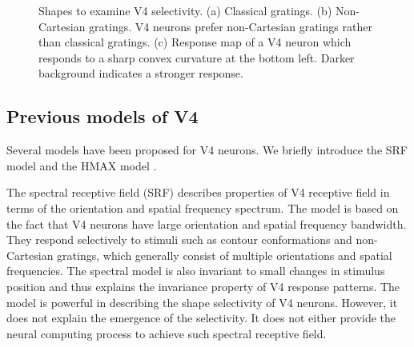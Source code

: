 \documentclass[5p]{elsarticle}
\begin{document}
\begin{figure}
\centering
{}\hfil
{}\hfil
{}
\caption{Shapes to examine V4 selectivity.
(a) Classical gratings.
(b) Non-Cartesian gratings. V4 neurons prefer non-Cartesian gratings rather than classical gratings.
(c) Response map of a V4 neuron which responds to a sharp convex curvature at the bottom left.
Darker background indicates a stronger response.}
\label{fig:2}
\end{figure}

\subsection{Previous models of V4}

Several models have been proposed for V4 neurons.
We briefly introduce the SRF model \cite{david2006} and the HMAX model \cite{riesenhuber1999,cadieu2007}.

The spectral receptive field (SRF) \cite{david2006}
describes properties of V4 receptive field in terms of the orientation and spatial frequency spectrum.
The model is based on the fact that V4 neurons have large orientation and spatial frequency bandwidth.
They respond selectively to stimuli such as contour conformations and non-Cartesian gratings,
which generally consist of multiple orientations and spatial frequencies.
The spectral model is also invariant to small changes in stimulus position 
and thus explains the invariance property of V4 response patterns.
The model is powerful in describing the shape selectivity of V4 neurons.
However, it does not explain the emergence of the selectivity.
It does not either provide the neural computing process to achieve such spectral receptive field.
\end{document}

